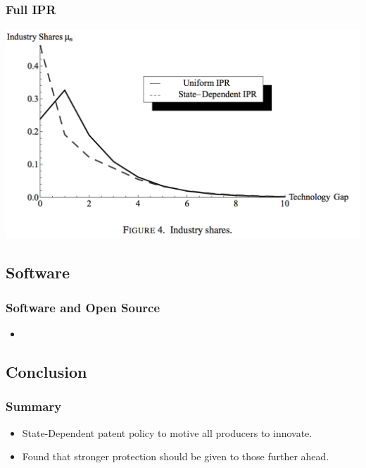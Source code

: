 \documentclass{beamer}
\begin{document}
\begin{frame}[t]\frametitle{Full IPR} 
  \begin{center}
    \includegraphics[scale=.28]{full_ipr_distbn.png}
    \label{fig:full_ipr_distbn}
  \end{center}
\end{frame}


\subsection{Software}
\label{sub:software}

\begin{frame}[t]\frametitle{Software and Open Source}
  \begin{itemize}
    \item<+-> 
  \end{itemize}
\end{frame}
\subsection{Conclusion}
\label{sub:conclusion}

\begin{frame}[t]\frametitle{Summary}
  \begin{itemize}
    \item<+-> State-Dependent patent policy to motive all producers to innovate.
    \item<+-> Found that stronger protection should be given to those further ahead.
  \end{itemize}  
\end{frame}
\end{document}
